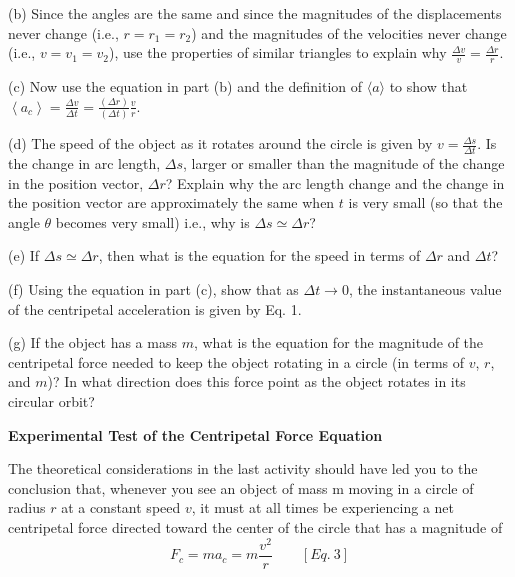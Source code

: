 (b) Since the angles are the same and since the magnitudes of the displacements
never change (i.e., \(r= r_{1}  = r_{2} \)) and the magnitudes of the
velocities never change (i.e., \(v = v_{1}  = v_{2} \)), use the properties
of similar triangles to explain why \( \frac{\Delta v}{v}=\frac{\Delta r}{r} \).
\vspace{20mm}

(c) Now use the equation in part (b) and the definition of 
$\langle a \rangle$ to show that
\( \left\langle a_{c}\right\rangle =\frac{\Delta v}{\Delta t}=\frac{\left( \Delta r\right) }{\left( \Delta t\right) }\frac{v}{r}. \)
\vspace{20mm}

(d) The speed of the object as it rotates around the circle is given by \( v=\frac{\Delta s}{\Delta t} \).
Is the change in arc length, \( \Delta s \), larger or smaller than the magnitude
of the change in the position vector, \( \Delta r \)? Explain why the arc length
change and the change in the position vector are approximately the same when
$t$ is very small (so that the angle $\theta$ becomes very small) i.e., why is
\( \Delta  s
 \simeq   \Delta  r\)?
\vspace{20mm}

(e) If \( \Delta s  \simeq   \Delta  r\), then what is the equation
for the speed in terms of \( \Delta  r\) and \( \Delta  t\)?
\vspace{20mm}

(f) Using the equation in part (c), show that as \( \Delta t  \rightarrow 0 \),
the instantaneous value of the centripetal acceleration is given by Eq. 1.
\vspace{20mm}

(g) If the object has a mass $m$, what is the equation for the magnitude of the
centripetal force needed to keep the object rotating in a circle (in terms of
$v$, $r$, and $m$)? In what direction does this force point as the object rotates
in its circular orbit?
\vspace{20mm}

\textbf{Experimental Test of the Centripetal Force Equation }

The theoretical considerations in the last activity should have led you to the
conclusion that, whenever you see an object of mass m moving in a circle of
radius $r$ at a constant speed $v$, it must at all times be experiencing a net centripetal
force directed toward the center of the circle that has a magnitude of
\[
F_{c}=ma_{c}=m\frac{v^{2}}{r}\qquad [Eq.\: 3]\]



